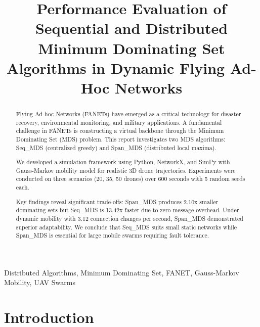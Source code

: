 \documentclass[conference]{IEEEtran}
\begin{document}
\title{Performance Evaluation of Sequential and Distributed Minimum Dominating Set Algorithms in Dynamic Flying Ad-Hoc Networks}

\author{
}

\maketitle

\begin{abstract}
Flying Ad-hoc Networks (FANETs) have emerged as a critical technology for disaster recovery, environmental monitoring, and military applications. A fundamental challenge in FANETs is constructing a virtual backbone through the Minimum Dominating Set (MDS) problem. This report investigates two MDS algorithms: Seq\_MDS (centralized greedy) and Span\_MDS (distributed local maxima).

We developed a simulation framework using Python, NetworkX, and SimPy with Gauss-Markov mobility model for realistic 3D drone trajectories. Experiments were conducted on three scenarios (20, 35, 50 drones) over 600 seconds with 5 random seeds each.

Key findings reveal significant trade-offs: Span\_MDS produces 2.10x smaller dominating sets but Seq\_MDS is 13.42x faster due to zero message overhead. Under dynamic mobility with 3.12 connection changes per second, Span\_MDS demonstrated superior adaptability. We conclude that Seq\_MDS suits small static networks while Span\_MDS is essential for large mobile swarms requiring fault tolerance.
\end{abstract}

\begin{IEEEkeywords}
Distributed Algorithms, Minimum Dominating Set, FANET, Gauss-Markov Mobility, UAV Swarms
\end{IEEEkeywords}

\section{Introduction}
\end{document}
